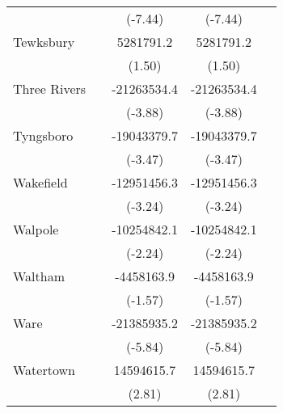 {\begin{tabular}{l*{4}{c}}
                    &                     &     (-7.44)         &     (-7.44)         &                     \\
\addlinespace
Tewksbury           &                     &   5281791.2         &   5281791.2         &                     \\
                    &                     &      (1.50)         &      (1.50)         &                     \\
\addlinespace
Three Rivers        &                     & -21263534.4\sym{***}& -21263534.4\sym{***}&                     \\
                    &                     &     (-3.88)         &     (-3.88)         &                     \\
\addlinespace
Tyngsboro           &                     & -19043379.7\sym{***}& -19043379.7\sym{***}&                     \\
                    &                     &     (-3.47)         &     (-3.47)         &                     \\
\addlinespace
Wakefield           &                     & -12951456.3\sym{**} & -12951456.3\sym{**} &                     \\
                    &                     &     (-3.24)         &     (-3.24)         &                     \\
\addlinespace
Walpole             &                     & -10254842.1\sym{*}  & -10254842.1\sym{*}  &                     \\
                    &                     &     (-2.24)         &     (-2.24)         &                     \\
\addlinespace
Waltham             &                     &  -4458163.9         &  -4458163.9         &                     \\
                    &                     &     (-1.57)         &     (-1.57)         &                     \\
\addlinespace
Ware                &                     & -21385935.2\sym{***}& -21385935.2\sym{***}&                     \\
                    &                     &     (-5.84)         &     (-5.84)         &                     \\
\addlinespace
Watertown           &                     &  14594615.7\sym{**} &  14594615.7\sym{**} &                     \\
                    &                     &      (2.81)         &      (2.81)         &                     \\

\end{tabular}}
